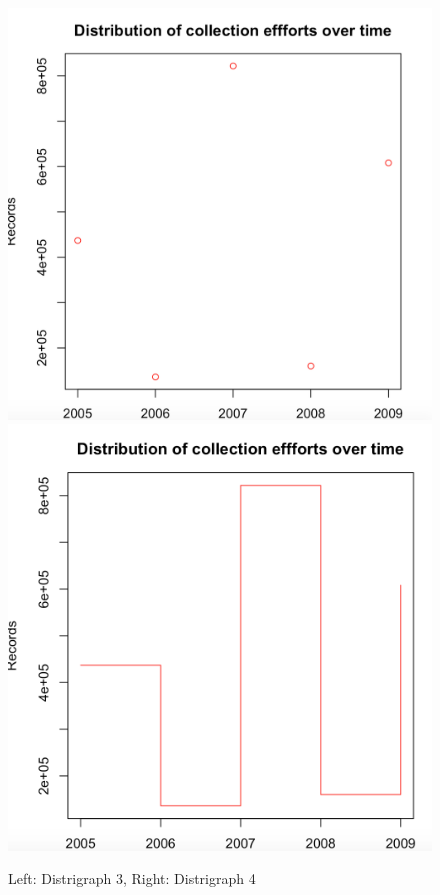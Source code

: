 \begin{figure}[htbp!] 
   \centering
   \includegraphics[scale=0.35]{pictures/biodiversity/distrograph3.jpg}
    \includegraphics[scale=0.35]{pictures/biodiversity/distrograph4.jpg}
      \caption{Left: Distrigraph 3, Right: Distrigraph 4 }
    \label{fig:distrigraph2}
\end{figure}

